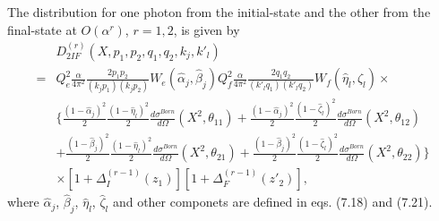 The distribution for one photon from the initial-state and the other from the final-state at $O(\alpha^r)$, $r=1,2$, is given by
\begin{align}
&D^{(r)}_{2IF}(X,p_1,p_2,q_1,q_2,k_j,k'_l)\nonumber\\
=&Q^2_e\frac{\alpha}{4\pi^2}\frac{2p_1p_2}{(k_jp_1)(k_jp_2)}W_e(\hat{\alpha}_j,\hat{\beta}_j)Q^2_f\frac{\alpha}{4\pi^2}\frac{2q_1q_2}{(k'_lq_1)(k'_lq_2)}W_f(\hat{\eta}_l,\hat{\zeta}_l)\times\nonumber\\
&\biggl\{ \frac{(1-\hat{\alpha}_j)^2}{2}\frac{(1-\hat{\eta}_l)^2}{2}\frac{d\sigma^{Born}}{d\Omega}(X^2,\theta_{11})+\frac{(1-\hat{\alpha}_j)^2}{2}\frac{(1-\hat{\zeta}_l)^2}{2}\frac{d\sigma^{Born}}{d\Omega}(X^2,\theta_{12})\nonumber\\
&+\frac{(1-\hat{\beta}_j)^2}{2}\frac{(1-\hat{\eta}_l)^2}{2}\frac{d\sigma^{Born}}{d\Omega}(X^2,\theta_{21})+\frac{(1-\hat{\beta}_j)^2}{2}\frac{(1-\hat{\zeta}_l)^2}{2}\frac{d\sigma^{Born}}{d\Omega}(X^2,\theta_{22})  \biggr\}\nonumber\\
&\times[1+\Delta_I^{(r-1)}(z_1)][1+\Delta_F^{(r-1)}(z'_2)],
\end{align}
where $\hat{\alpha}_j$, $\hat{\beta}_j$, $\hat{\eta}_l$, $\hat{\zeta}_l$ and other componets are defined in eqs. (7.18) and (7.21).

